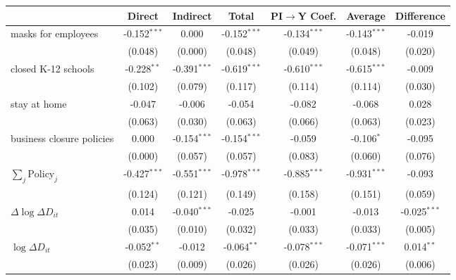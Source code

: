 
\begin{tabular}{lccccc|>{}c}
\toprule
  & Direct & Indirect & Total & PI$\to$Y Coef. & Average & Difference\\
\midrule
masks for employees & -0.152$^{***}$ & 0.000 & -0.152$^{***}$ & -0.134$^{***}$ & -0.143$^{***}$ & -0.019\\
 & (0.048) & (0.000) & (0.048) & (0.049) & (0.048) & (0.020)\\
closed K-12 schools & -0.228$^{**}$ & -0.391$^{***}$ & -0.619$^{***}$ & -0.610$^{***}$ & -0.615$^{***}$ & -0.009\\
 & (0.102) & (0.079) & (0.117) & (0.114) & (0.114) & (0.030)\\
stay at home & -0.047 & -0.006 & -0.054 & -0.082 & -0.068 & 0.028\\
 & (0.063) & (0.030) & (0.063) & (0.066) & (0.063) & (0.023)\\
business closure policies & 0.000 & -0.154$^{***}$ & -0.154$^{***}$ & -0.059 & -0.106$^{*}$ & -0.095\\
 & (0.000) & (0.057) & (0.057) & (0.083) & (0.060) & (0.076)\\
$\sum_j \mathrm{Policy}_j$ & -0.427$^{***}$ & -0.551$^{***}$ & -0.978$^{***}$ & -0.885$^{***}$ & -0.931$^{***}$ & -0.093\\
 & (0.124) & (0.121) & (0.149) & (0.158) & (0.151) & (0.059)\\
$\Delta \log \Delta D_{it}$ & 0.014 & -0.040$^{***}$ & -0.025 & -0.001 & -0.013 & -0.025$^{***}$\\
 & (0.035) & (0.010) & (0.032) & (0.033) & (0.033) & (0.005)\\
$\log \Delta D_{it}$ & -0.052$^{**}$ & -0.012 & -0.064$^{**}$ & -0.078$^{***}$ & -0.071$^{***}$ & 0.014$^{**}$\\
 & (0.023) & (0.009) & (0.026) & (0.026) & (0.026) & (0.006)\\
\bottomrule
\end{tabular}